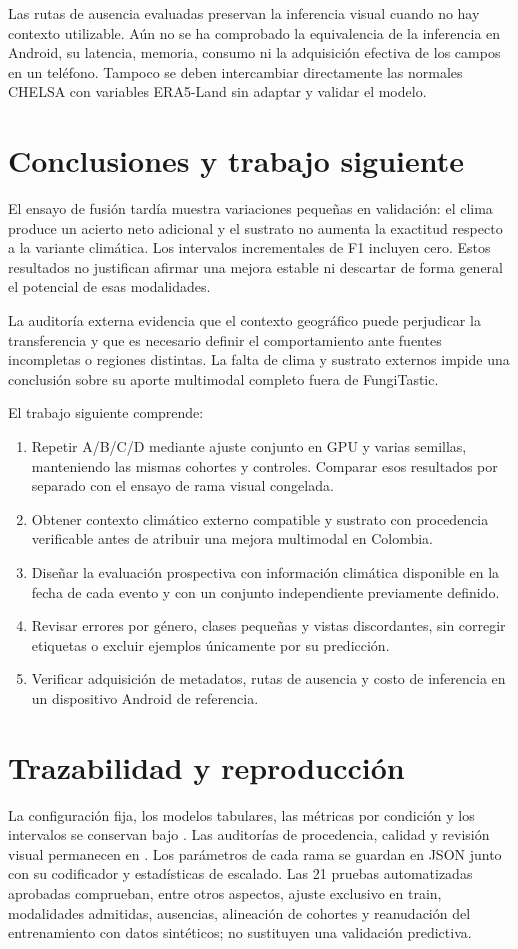 \documentclass[11pt,a4paper]{article}
\begin{document}
Las rutas de ausencia evaluadas preservan la inferencia visual cuando no hay
contexto utilizable. Aún no se ha comprobado la equivalencia de la inferencia
en Android, su latencia, memoria, consumo ni la adquisición efectiva de los
campos en un teléfono. Tampoco se deben intercambiar directamente las
normales CHELSA con variables ERA5-Land sin adaptar y validar el modelo.

\section{Conclusiones y trabajo siguiente}
El ensayo de fusión tardía muestra variaciones pequeñas en validación: el
clima produce un acierto neto adicional y el sustrato no aumenta la exactitud
respecto a la variante climática. Los intervalos incrementales de F1 incluyen
cero. Estos resultados no justifican afirmar una mejora estable ni descartar
de forma general el potencial de esas modalidades.

La auditoría externa evidencia que el contexto geográfico puede perjudicar
la transferencia y que es necesario definir el comportamiento ante fuentes
incompletas o regiones distintas. La falta de clima y sustrato externos impide
una conclusión sobre su aporte multimodal completo fuera de FungiTastic.

El trabajo siguiente comprende:
\begin{enumerate}
\item Repetir A/B/C/D mediante ajuste conjunto en GPU y varias semillas,
manteniendo las mismas cohortes y controles. Comparar esos resultados por
separado con el ensayo de rama visual congelada.
\item Obtener contexto climático externo compatible y sustrato con
procedencia verificable antes de atribuir una mejora multimodal en Colombia.
\item Diseñar la evaluación prospectiva con información climática disponible
en la fecha de cada evento y con un conjunto independiente previamente definido.
\item Revisar errores por género, clases pequeñas y vistas discordantes, sin
corregir etiquetas o excluir ejemplos únicamente por su predicción.
\item Verificar adquisición de metadatos, rutas de ausencia y costo de
inferencia en un dispositivo Android de referencia.
\end{enumerate}

\section*{Trazabilidad y reproducción}
La configuración fija, los modelos tabulares, las métricas por condición y
los intervalos se conservan bajo .
Las auditorías de procedencia, calidad y revisión visual permanecen en
. Los parámetros de cada rama se guardan en JSON junto con
su codificador y estadísticas de escalado. Las 21 pruebas automatizadas
aprobadas comprueban, entre otros aspectos, ajuste exclusivo en train,
modalidades admitidas, ausencias, alineación de cohortes y reanudación del
entrenamiento con datos sintéticos; no sustituyen una validación predictiva.
\end{document}

